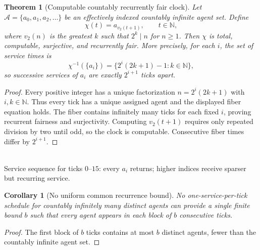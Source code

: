 \documentclass[10pt,letterpaper]{article}
\newtheorem{theorem}[definition]{Theorem}
\newtheorem{corollary}[definition]{Corollary}
\theoremstyle{remark}\newtheorem{remark}[definition]{Remark}
\newcommand{\Ag}{\mathcal{A}}
\newcommand{\N}{\mathbb{N}}
\begin{document}
\begin{theorem}[Computable countably recurrently fair clock]
Let $\Ag=\{a_0,a_1,a_2,\ldots\}$ be an effectively indexed countably infinite agent set. Define
\[
\boxed{\chi(t)=a_{v_2(t+1)}},\qquad t\in\N,
\]
where $v_2(n)$ is the greatest $k$ such that $2^k\mid n$ for $n\ge1$. Then $\chi$ is total, computable, surjective, and recurrently fair. More precisely, for each $i$, the set of service times is
\[
\chi^{-1}(\{a_i\})=\{2^i(2k+1)-1:k\in\N\},
\]
so successive services of $a_i$ are exactly $2^{i+1}$ ticks apart.
\end{theorem}
\begin{proof}
Every positive integer has a unique factorization $n=2^i(2k+1)$ with $i,k\in\N$. Thus every tick has a unique assigned agent and the displayed fiber equation holds. The fiber contains infinitely many ticks for each fixed $i$, proving recurrent fairness and surjectivity. Computing $v_2(t+1)$ requires only repeated division by two until odd, so the clock is computable. Consecutive fiber times differ by $2^{i+1}$.
\end{proof}

\begin{center}
\\[-2pt]
{\footnotesize Service sequence for ticks $0$--$15$: every $a_i$ returns; higher indices receive sparser but recurring service.}
\end{center}

\begin{corollary}[No uniform common recurrence bound]
No one-service-per-tick schedule for countably infinitely many distinct agents can provide a \emph{single finite} bound $b$ such that every agent appears in each block of $b$ consecutive ticks.
\end{corollary}
\begin{proof}
The first block of $b$ ticks contains at most $b$ distinct agents, fewer than the countably infinite agent set.
\end{proof}
\end{document}
